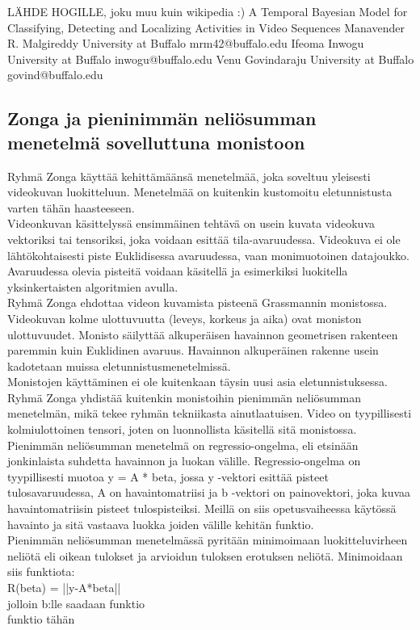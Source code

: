 LÄHDE HOGILLE, joku muu kuin wikipedia :)
A Temporal Bayesian Model for Classifying, Detecting and Localizing Activities
in Video Sequences
Manavender R. Malgireddy
University at Buffalo
mrm42@buffalo.edu
Ifeoma Inwogu
University at Buffalo
inwogu@buffalo.edu
Venu Govindaraju
University at Buffalo
govind@buffalo.edu

\subsection{Zonga ja pieninimmän neliösumman menetelmä sovelluttuna monistoon}
Ryhmä Zonga käyttää kehittämäänsä menetelmää, joka soveltuu yleisesti videokuvan luokitteluun. 
Menetelmää on kuitenkin kustomoitu eletunnistusta varten tähän haasteeseen.\\

Videonkuvan käsittelyssä ensimmäinen tehtävä on usein kuvata videokuva vektoriksi tai tensoriksi, joka voidaan esittää tila-avaruudessa. 
Videokuva ei ole lähtökohtaisesti piste Euklidisessa avaruudessa, vaan monimuotoinen datajoukko. Avaruudessa olevia pisteitä voidaan käsitellä
ja esimerkiksi luokitella yksinkertaisten algoritmien avulla.\\

Ryhmä Zonga ehdottaa videon kuvamista pisteenä Grassmannin monistossa. Videokuvan kolme ulottuvuutta (leveys, korkeus ja aika) ovat moniston ulottuvuudet.
Monisto säilyttää alkuperäisen havainnon geometrisen rakenteen paremmin kuin Euklidinen avaruus.
Havainnon alkuperäinen rakenne usein kadotetaan muissa eletunnistusmenetelmissä. \\

Monistojen käyttäminen ei ole kuitenkaan täysin uusi asia eletunnistuksessa.
Ryhmä Zonga yhdistää kuitenkin monistoihin pienimmän neliösumman menetelmän, mikä tekee ryhmän tekniikasta ainutlaatuisen. 
Video on tyypillisesti kolmiulottoinen tensori, joten on luonnollista käsitellä sitä monistossa.
Pienimmän neliösumman menetelmä on regressio-ongelma, eli etsinään jonkinlaista suhdetta havainnon ja luokan välille.
Regressio-ongelma on tyypillisesti muotoa y = A * beta, jossa y -vektori esittää pisteet tulosavaruudessa, A on havaintomatriisi 
ja b -vektori on painovektori, joka kuvaa havaintomatriisin pisteet tulospisteiksi.
Meillä on siis opetusvaiheessa käytössä havainto ja sitä vastaava luokka joiden välille kehitän funktio.\\

Pienimmän neliösumman menetelmässä pyritään minimoimaan luokitteluvirheen neliötä eli oikean tulokset ja arvioidun tuloksen erotuksen neliötä.
Minimoidaan siis funktiota: \\
R(beta) = ||y-A*beta|| \\
jolloin b:lle saadaan funktio\\
funktio tähän\\

